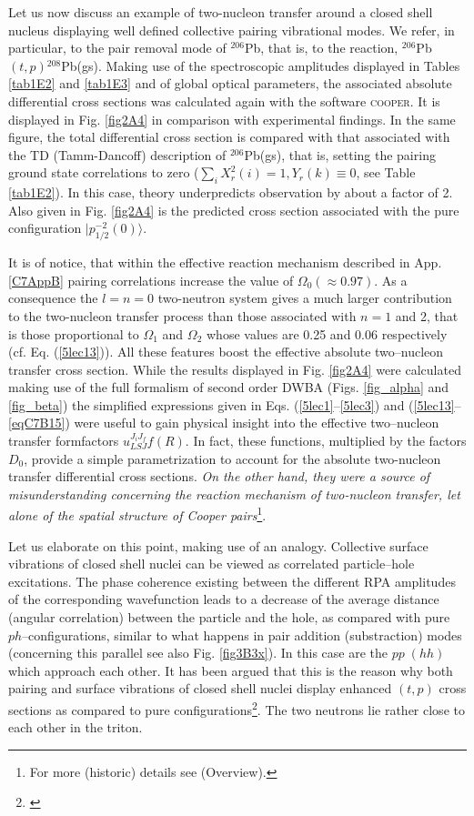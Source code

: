Let us now discuss an example of two-nucleon transfer around a closed shell nucleus displaying well defined collective pairing vibrational modes. We refer, in particular, to the pair removal mode of $^{206}$Pb, that is, to the reaction, $^{206}$Pb$(t,p)$$^{208}$Pb(gs). Making use of the spectroscopic amplitudes displayed in Tables \ref{tab1E2} and \ref{tab1E3} and of global optical parameters, the associated  absolute differential cross sections was calculated again with the software \textsc{cooper}. It is displayed in Fig. \ref{fig2A4} in comparison with experimental findings. In  the same figure, the total differential cross section is compared with that associated with the TD (Tamm-Dancoff) description of $^{206}$Pb(gs), that is, setting the pairing ground state correlations to zero ($\sum_i X^2_r(i)=1, Y_r(k)\equiv 0$, see Table \ref{tab1E2}). In this case, theory underpredicts observation by about a factor of 2.  Also given in Fig. \ref{fig2A4} is the predicted cross section associated with the pure configuration $|p_{1/2}^{-2}(0)\rangle$. 


It is of notice, that within the effective reaction mechanism described in App. \ref{C7AppB} pairing correlations increase the value of $\Omega_0(\approx 0.97)$. As a consequence the   $l=n=0$ two-neutron system gives a much larger contribution to the two-nucleon transfer process than those associated with $n=1$ and 2, that is those proportional to $\Omega_1$ and $\Omega_2$ whose values are 0.25 and 0.06 respectively (cf. Eq. (\ref{5lec13})). All these features boost the effective absolute two--nucleon  transfer cross section. While the results displayed in Fig. \ref{fig2A4} were calculated making use of the full formalism of second order DWBA (Figs. \ref{fig_alpha} and \ref{fig_beta}) the simplified expressions given in Eqs. (\ref{5lec1}--\ref{5lec3}) and (\ref{5lec13}--\ref{eqC7B15}) were useful to gain physical insight into the effective  two--nucleon transfer formfactors $u^{J_iJ_f}_{LSJ}f(R)$. In fact, these functions, multiplied by the factors $D_0$, provide a simple parametrization to account for the absolute two-nucleon transfer  differential cross sections. \emph{On the other hand, they were a source of misunderstanding concerning the reaction mechanism of two-nucleon transfer, let alone of the spatial structure of Cooper pairs}\footnote{For more (historic) details see \cite{Bohr:19} (Overview).}.


 Let us elaborate on this point, making use of an analogy. Collective surface vibrations of closed shell nuclei can be viewed as correlated particle--hole excitations. The phase coherence existing between the different RPA amplitudes of the corresponding wavefunction leads to a decrease of the average distance (angular correlation) between the particle and the hole, as compared with pure $ph$--configurations, similar to what happens in pair addition (substraction) modes (concerning this parallel see also Fig. \ref{fig3B3x}). In this case are the $pp\;(hh)$ which approach each other. It has been argued that this is the reason why both pairing and surface vibrations of closed shell nuclei display enhanced $(t,p)$ cross sections as compared to pure configurations\footnote{\cite{Bertsch:67}}. The two neutrons lie rather close to each other in the triton.


